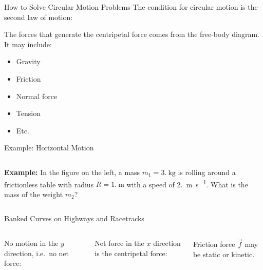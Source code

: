 \documentclass[12pt,compress,aspectratio=169]{beamer}
\begin{document}
\begin{frame}{How to Solve Circular Motion Problems}
  The condition for circular motion is the second law of motion:

  
  The forces that generate the centripetal force comes from the free-body
  diagram. It may include:
  \begin{itemize}
  \item Gravity
  \item Friction
  \item Normal force
  \item Tension
  \item Etc.
  \end{itemize}
\end{frame}



\begin{frame}{Example: Horizontal Motion}
  \begin{columns}
    
    \textbf{Example:} In the figure on the left, a mass
    $m_1=\SI{3.}{\kilo\gram}$ is rolling around a frictionless table with
    radius $R=\SI{1.}\metre$ with a speed of \SI{2.}{\metre\per\second}.
    What is the mass of the weight $m_2$?
  \end{columns}
\end{frame}



\begin{frame}{Banked Curves on Highways and Racetracks}
  \begin{columns}
    \centering
    

    No motion in the $y$ direction, i.e.\ no net force:


    Net force in the $x$ direction is the centripetal force:


    Friction force $\vec f$ may be static or kinetic.
  \end{columns}
\end{frame}
\end{document}
